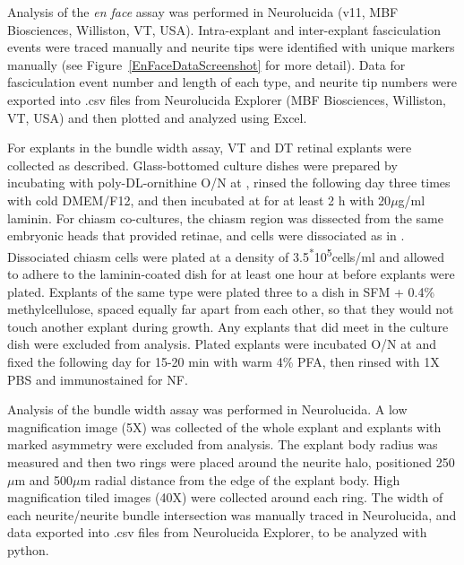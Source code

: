 Analysis of the \emph{en face} assay was performed in Neurolucida (v11, MBF Biosciences, Williston, VT, USA).
Intra-explant and inter-explant fasciculation events were traced manually and neurite tips were identified with unique markers manually (see Figure~\ref{EnFaceDataScreenshot} for more detail).
Data for fasciculation event number and length of each type, and neurite tip numbers were exported into .csv files from Neurolucida Explorer (MBF Biosciences, Williston, VT, USA) and then plotted and analyzed using Excel.

For explants in the bundle width assay, VT and DT retinal explants were collected as described.
Glass-bottomed culture dishes were prepared by incubating with poly-DL-ornithine O/N at , rinsed the following day three times with cold DMEM/F12, and then incubated at  for at least 2 h with 20$\mu$g/ml laminin.
For chiasm co-cultures, the chiasm region was dissected from the same embryonic heads that provided retinae, and cells were dissociated as in .
Dissociated chiasm cells were plated at a density of 3.5\textsuperscript{*}10\textsuperscript{5}cells/ml and allowed to adhere to the laminin-coated dish for at least one hour at  before explants were plated.
Explants of the same type were plated three to a dish in SFM + 0.4\% methylcellulose, spaced equally far apart from each other, so that they would not touch another explant during growth.
Any explants that did meet in the culture dish were excluded from analysis.
Plated explants were incubated O/N at  and fixed the following day for 15-20 min with warm 4\% PFA, then rinsed with 1X PBS and immunostained for NF.

Analysis of the bundle width assay was performed in Neurolucida.
A low magnification image (5X) was collected of the whole explant and explants with marked asymmetry were excluded from analysis.
The explant body radius was measured and then two rings were placed around the neurite halo, positioned 250$\mu$m and 500$\mu$m radial distance from the edge of the explant body.
High magnification tiled images (40X) were collected around each ring.
The width of each neurite/neurite bundle intersection was manually traced in Neurolucida, and data exported into .csv files from Neurolucida Explorer, to be analyzed with python.

